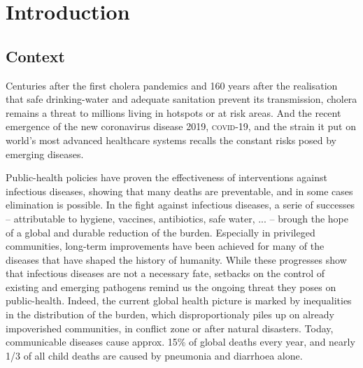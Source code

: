 \chapter*{Introduction} 

 \section{Context}
 Centuries after the first cholera pandemics and 160 years after the realisation that safe drinking-water and adequate sanitation prevent its transmission, cholera remains a threat to millions living in hotspots or at risk areas. And the recent emergence of the new coronavirus disease 2019, \textsc{covid}-19, and the strain it put on world's most advanced healthcare systems recalls the constant risks posed by emerging diseases. 
 
 Public-health policies have proven the effectiveness of interventions against infectious diseases, showing that many deaths are preventable, and in some cases elimination is possible. In the fight against infectious diseases, a serie of successes -- attributable to \eg hygiene, vaccines, antibiotics, safe water, ... -- brough the hope of a global and durable reduction of the burden. Especially in privileged communities, long-term improvements have been achieved for many of the diseases that have shaped the history of humanity. While these progresses show that infectious diseases are not a necessary fate, setbacks on the control of existing and emerging pathogens remind us the ongoing threat they poses on public-health. 
  Indeed, the current global health picture is marked by inequalities in the distribution of the burden, which disproportionaly piles up on already impoverished communities, in conflict zone or after natural disasters. Today, communicable diseases cause approx. 15\% of global deaths every year\cite[-4\baselineskip][tab. 1, excl. non-transmissible neonatal and maternal diseases and nutritional diseases; pre-\textsc{covid}-19 estimates]{Roth:GlobalRegionalNational:2018}, and nearly 1/3 of all child deaths are caused by pneumonia and diarrhoea alone\cite[][\textsc{m} deaths among under 5, every year.]{WHO:EndingPreventableChild:2013}.  
  
